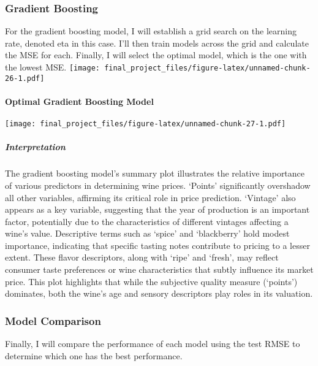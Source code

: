 \documentclass[
]{article}
\begin{document}
\hypertarget{gradient-boosting}{%
\subsubsection{Gradient Boosting}\label{gradient-boosting}}

For the gradient boosting model, I will establish a grid search on the
learning rate, denoted eta in this case. I'll then train models across
the grid and calculate the MSE for each. Finally, I will select the
optimal model, which is the one with the lowest MSE.
\texttt{[image: final\_project\_files/figure-latex/unnamed-chunk-26-1.pdf]}

\hypertarget{optimal-gradient-boosting-model}{%
\paragraph{Optimal Gradient Boosting
Model}\label{optimal-gradient-boosting-model}}

\texttt{[image: final\_project\_files/figure-latex/unnamed-chunk-27-1.pdf]}

\hypertarget{interpretation-2}{%
\subparagraph{Interpretation}\label{interpretation-2}}

The gradient boosting model's summary plot illustrates the relative
importance of various predictors in determining wine prices. `Points'
significantly overshadow all other variables, affirming its critical
role in price prediction. `Vintage' also appears as a key variable,
suggesting that the year of production is an important factor,
potentially due to the characteristics of different vintages affecting a
wine's value. Descriptive terms such as `spice' and `blackberry' hold
modest importance, indicating that specific tasting notes contribute to
pricing to a lesser extent. These flavor descriptors, along with `ripe'
and `fresh', may reflect consumer taste preferences or wine
characteristics that subtly influence its market price. This plot
highlights that while the subjective quality measure (`points')
dominates, both the wine's age and sensory descriptors play roles in its
valuation.

\hypertarget{model-comparison}{%
\subsubsection{Model Comparison}\label{model-comparison}}

Finally, I will compare the performance of each model using the test
RMSE to determine which one has the best performance.
\end{document}
